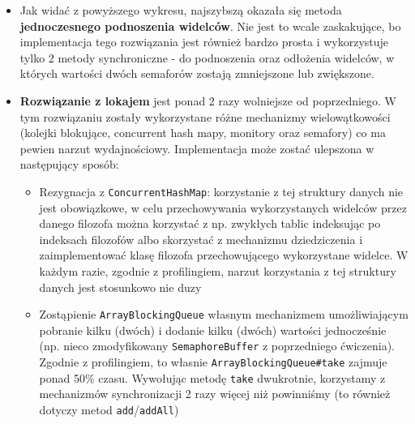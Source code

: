 \documentclass[11pt]{article}
\begin{document}
    \begin{itemize}
\item
  Jak widać z powyższego wykresu, najszybszą okazała się metoda
  \textbf{jednoczesnego podnoszenia widelców}. Nie jest to wcale
  zaskakujące, bo implementacja tego rozwiązania jest również bardzo
  prosta i wykorzystuje tylko 2 metody synchroniczne - do podnoszenia
  oraz odłożenia widelców, w których wartości dwóch semaforów zostają
  zmniejszone lub zwiększone.
\item
  \textbf{Rozwiązanie z lokajem} jest ponad 2 razy wolniejsze od
  poprzedniego. W tym rozwiązaniu zostały wykorzystane różne mechanizmy
  wielowątkowości (kolejki blokujące, concurrent hash mapy, monitory
  oraz semafory) co ma pewien narzut wydajnościowy. Implementacja może
  zostać ulepszona w następujący sposób:

  \begin{itemize}
  \item
    Rezygnacja z \texttt{ConcurrentHashMap}: korzystanie z tej struktury
    danych nie jest obowiązkowe, w celu przechowywania wykorzystanych
    widelców przez danego filozofa można korzystać z np. zwykłych tablic
    indeksując po indeksach filozofów albo skorzystać z mechanizmu
    dziedziczenia i zaimplementować klasę filozofa przechowującego
    wykorzystane widelce. W każdym razie, zgodnie z profilingiem, narzut
    korzystania z tej struktury danych jest stosunkowo nie duzy
  \item
    Zostąpienie \texttt{ArrayBlockingQueue} własnym mechanizmem
    umożliwiającym pobranie kilku (dwóch) i dodanie kilku (dwóch)
    wartości jednocześnie (np. nieco zmodyfikowany
    \texttt{SemaphoreBuffer} z poprzedniego ćwiczenia). Zgodnie z
    profilingiem, to własnie \texttt{ArrayBlockingQueue\#take} zajmuje
    ponad 50\% czasu. Wywołując metodę \texttt{take} dwukrotnie,
    korzystamy z mechanizmów synchronizacji 2 razy więcej niż powinniśmy
    (to również dotyczy metod \texttt{add}/\texttt{addAll})


\end{itemize}
\end{itemize}
\end{document}
